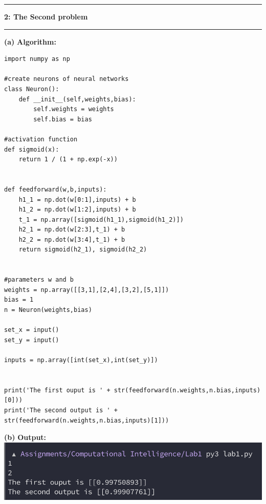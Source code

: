 \documentclass[11pt]{article}
\newcommand\question[2]{\vspace{.25in}\hrule\textbf{#1: #2}\vspace{.5em}\hrule\vspace{.10in}}
\renewcommand\part[1]{\vspace{.10in}\textbf{(#1)}}
\newcommand\al{\vspace{.10in}\textbf{Algorithm: }}
\newcommand\op{\vspace{.10in}\textbf{Output: }}
\begin{document}
\question{2}{The Second problem}
\part{a} \al
\begin{lstlisting}
import numpy as np

#create neurons of neural networks
class Neuron():
    def __init__(self,weights,bias):
        self.weights = weights
        self.bias = bias

#activation function
def sigmoid(x):
    return 1 / (1 + np.exp(-x))


def feedforward(w,b,inputs):
    h1_1 = np.dot(w[0:1],inputs) + b
    h1_2 = np.dot(w[1:2],inputs) + b
    t_1 = np.array([sigmoid(h1_1),sigmoid(h1_2)])
    h2_1 = np.dot(w[2:3],t_1) + b
    h2_2 = np.dot(w[3:4],t_1) + b
    return sigmoid(h2_1), sigmoid(h2_2)


#parameters w and b
weights = np.array([[3,1],[2,4],[3,2],[5,1]])
bias = 1
n = Neuron(weights,bias)

set_x = input() 
set_y = input()

inputs = np.array([int(set_x),int(set_y)])


print('The first ouput is ' + str(feedforward(n.weights,n.bias,inputs)[0]))
print('The second output is ' + str(feedforward(n.weights,n.bias,inputs)[1]))
\end{lstlisting}

\part{b} \op \\
\includegraphics[]{op.png}
\end{document}
